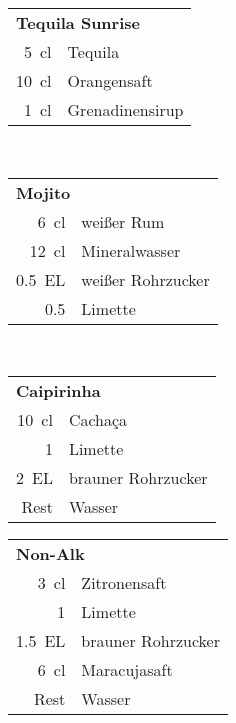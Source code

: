 \begin{table}[h!]
  \vspace{1cm}
  \begin{subtable}[t]{0.3\textwidth}
    \vspace{0pt}
    \begin{tabular}{|rl|} \hline
      \multicolumn{2}{|l|}{\textbf{Tequila Sunrise}} \\
      \SI{5}{\centi\litre} & Tequila \\
      \SI{10}{\centi\litre} & Orangensaft \\
      \SI{1}{\centi\litre} & Grenadinensirup \\ \hline
    \end{tabular}
  \end{subtable}
  ~
  \begin{subtable}[t]{0.3\textwidth}
    \vspace{0pt}
    \begin{tabular}{|rl|} \hline
      \multicolumn{2}{|l|}{\textbf{Mojito}} \\
      \SI{6}{\centi\litre} & weißer Rum \\
      \SI{12}{\centi\litre} & Mineralwasser \\
      \SI{0.5}{EL} & weißer Rohrzucker \\
      \num{0.5} & Limette \\ \hline
    \end{tabular}
  \end{subtable}
  ~
  \begin{subtable}[t]{0.3\textwidth}
    \vspace{0pt}
    \begin{tabular}{|rl|} \hline
      \multicolumn{2}{|l|}{\textbf{Caipirinha}} \\
      \SI{10}{\centi\litre} & Cachaça \\
      \num{1} & Limette \\
      \SI{2}{EL} & brauner Rohrzucker \\
      Rest & Wasser \\ \hline
    \end{tabular}
  \end{subtable}

  \vspace{1cm}
  \begin{subtable}[t]{0.3\textwidth}
    \vspace{0pt}
    \begin{tabular}{|rl|} \hline
      \multicolumn{2}{|l|}{\textbf{Non-Alk}} \\
      \SI{3}{\centi\litre} & Zitronensaft \\
      \num{1} & Limette \\
      \SI{1.5}{EL} & brauner Rohrzucker \\
      \SI{6}{\centi\litre} & Maracujasaft \\
      Rest & Wasser \\ \hline
    \end{tabular}
  \end{subtable}
  ~
\end{table}
